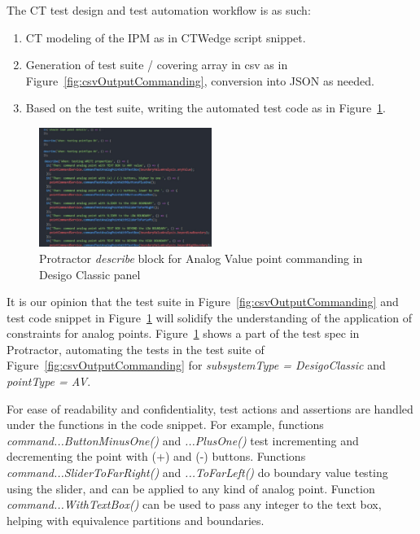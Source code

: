 \documentclass[conference]{IEEEtran}
\begin{document}
	The CT test design and test automation workflow is as such:
	\begin{enumerate}
		\item CT modeling of the IPM as in CTWedge script snippet.
		\item Generation of test suite / covering array in csv as in Figure~\ref{fig:csvOutputCommanding}, conversion into JSON as needed.
		\item Based on the test suite, writing the automated test code as in Figure~\ref{fig:pointCommandingTestCode}.
	\end{enumerate}

	\begin{figure}[!b]
		\includegraphics[width=0.50\textwidth,]{pointCommandingTestCode.pdf}
		\caption{Protractor \textit{describe} block for Analog Value point commanding in Desigo Classic panel}
		\label{fig:pointCommandingTestCode}
	\end{figure}

	It is our opinion that the test suite in Figure~\ref{fig:csvOutputCommanding} and test code snippet in Figure~\ref{fig:pointCommandingTestCode} will solidify the understanding of the application of constraints for analog points.
	Figure~\ref{fig:pointCommandingTestCode} shows a part of the test spec in Protractor, automating the tests in the test suite of Figure~\ref{fig:csvOutputCommanding} for \textit{subsystemType = DesigoClassic} and \textit{pointType = AV}.
	
	For ease of readability and confidentiality, test actions and assertions are handled under the functions in the code snippet. 
	For example, functions \textit{command...ButtonMinusOne()} and \textit{...PlusOne()} test incrementing and decrementing the point with (+) and (-) buttons.
	Functions \textit{command...SliderToFarRight()} and \textit{...ToFarLeft()} do boundary value testing using the slider, and can be applied to any kind of analog point.
	Function \textit{command...WithTextBox()} can be used to pass any integer to the text box, helping with equivalence partitions and boundaries.
\end{document}
